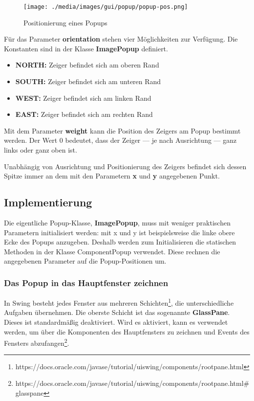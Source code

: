 \begin{figure}[h!]
\centering
\texttt{[image: ./media/images/gui/popup/popup-pos.png]}
\caption{Positionierung eines Popups}
\end{figure}

Für das Parameter \textbf{orientation} stehen vier Möglichkeiten zur Verfügung. Die Konstanten sind in der Klasse \textbf{ImagePopup} definiert.
\begin{itemize}
\item \textbf{NORTH:} Zeiger befindet sich am oberen Rand
\item \textbf{SOUTH:} Zeiger befindet sich am unteren Rand
\item \textbf{WEST:} Zeiger befindet sich am linken Rand
\item \textbf{EAST:} Zeiger befindet sich am rechten Rand
\end{itemize}

Mit dem Parameter \textbf{weight} kann die Position des Zeigers am Popup bestimmt werden. Der Wert 0 bedeutet, dass der Zeiger --- je nach Ausrichtung --- ganz links oder ganz oben ist.

Unabhängig von Ausrichtung und Positionierung des Zeigers befindet sich dessen Spitze immer an dem mit den Parametern \textbf{x} und \textbf{y} angegebenen Punkt.

\subsection{Implementierung}
Die eigentliche Popup-Klasse, \textbf{ImagePopup}, muss mit weniger praktischen Parametern initialisiert werden: mit x und y ist beispielsweise die linke obere Ecke des Popups anzugeben. Deshalb werden zum Initialisieren die statischen Methoden in der Klasse ComponentPopup verwendet. Diese rechnen die angegebenen Parameter auf die Popup-Positionen um.

\subsubsection*{Das Popup in das Hauptfenster zeichnen}
In Swing besteht jedes Fenster aus mehreren Schichten\footnote{https://docs.oracle.com/javase/tutorial/uiswing/components/rootpane.html}, die unterschiedliche Aufgaben übernehmen. Die oberste Schicht ist das sogenannte \textbf{GlassPane}. Dieses ist standardmäßig deaktiviert. Wird es aktiviert, kann es verwendet werden, um über die Komponenten des Hauptfensters zu zeichnen und Events des Fensters abzufangen\footnote{https://docs.oracle.com/javase/tutorial/uiswing/components/rootpane.html\#glasspane}.

